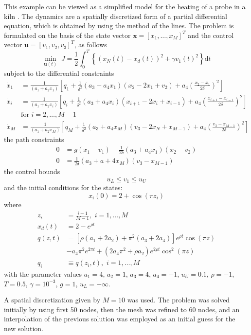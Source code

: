 \documentclass[a4paper,11pt]{report}    %
\begin{document}
This example can be viewed as a simplified model for the heating of a probe in a kiln \cite{Betts:01}. 
The dynamics are a spatially discretized form of a partial differential equation, which is obtained by 
using the method of the lines. The problem is formulated on the basis of the state vector 
$\mathbf{x} = [x_1, \ldots, x_M]^T$ and the control vector $\mathbf{u}=[v_1, v_2, v_3]^T$, as follows
\[ 
  \min_{\mathbf{u}(t)} \,\, J = \frac{1}{2} \int_0^T \left\{ (x_N(t)-x_d(t))^2 + \gamma v_1(t)^2 \right\} \mathrm{d}t
\]
subject to the differential constraints
\[
\begin{aligned}
  \dot x_1 &= \frac{1}{(a_1 + a_2 x_1 )} \left[q_1 + \frac{1}{\delta^2}(a_3+a_4x_1)(x_2-2x_1+v_2) + a_4\left( \frac{x_2-x_1}{2\delta} \right)^2  \right] \\
  \dot x_i &= \frac{1}{(a_1 + a_2 x_i )} \left[q_i + \frac{1}{\delta^2}(a_3+a_4x_i)(x_{i+1}-2x_i+x_{i-1}) + a_4\left( \frac{x_{i+1}-x_{i-1}}{2\delta} \right)^2  \right] \\
  &\mathrm{for} \,\, i=2,\ldots,M-1 \\
  \dot x_M &= \frac{1}{(a_1 + a_2 x_M )} \left[q_M + \frac{1}{\delta^2}(a_3+a_4x_M)(v_3-2x_N+x_{M-1}) + a_4\left( \frac{v_3-x_{M-1}}{2\delta} \right)^2  \right] 
\end{aligned}
\]
the path constraints
\[
 \begin{aligned}
   0 &= g(x_1-v_1) - \frac{1}{2\delta}(a_3 + a_4 x_1)(x_2-v_2) \\
   0 &=  \frac{1}{2 \delta} (a_3 + a+4 x_M)(v_3 - x_{M-1})
 \end{aligned}
\]
the control bounds
\[
  u_L \le v_1 \le u_U
\]
and the initial conditions for the states:
\[
  x_i(0) = 2 + \cos(\pi z_i)
\]
where
\[
\begin{aligned}
  z_i &= \frac{i-1}{M-1}, \,\, i=1,\ldots,M \\
  x_d(t) &= 2- e^{\rho t} \\
  q(z,t) &= \left[ \rho( a_1 + 2 a_2) + \pi^2(a_3+2a_4) \right] e^{\rho t} \cos(\pi z) \\
         & - a_4 \pi^2 e^{2\pi t} + (2 a_4 \pi^2 + \rho a_2) e^{2 \rho t} \cos^2(\pi z)\\
  q_i &\equiv q(z_i, t), \,\, i=1,\ldots,M 
\end{aligned}
\]
with the parameter values $a_1=4$, $a_2=1$, $a_3=4$, $a_4=-1$, $u_U=0.1$, $\rho=-1$, $T=0.5$, $\gamma=10^{-3}$, 
$g=1$, $u_L=-\infty$.

A spatial discretization given by $M=10$ was used.  The problem was solved initially by using first 50 nodes, then the mesh was refined
to 60 nodes, and an interpolation of the previous solution was employed as an initial guess for the new solution.
\end{document}
